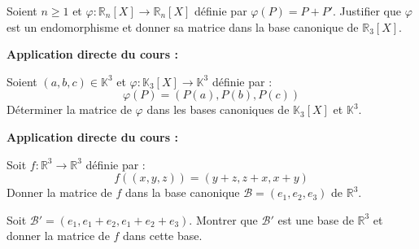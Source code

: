 \documentclass[french,11pt,twoside]{VcCours}
\newenvironment{ApplicationDirecte}{\textbf{Application directe du cours :}

}{}
\begin{document}
\vspace*{5cm}


\begin{Exemple}\label{det} Soient $n \geq 1$ et $\varphi : \mathbb{R}_n[X] \rightarrow \mathbb{R}_n[X]$ définie par $\varphi(P)=P+P'$. Justifier que $\varphi$ est un endomorphisme et donner sa matrice dans la base canonique de  $\mathbb{R}_3[X]$.


        \newpage


%
\end{Exemple}

\medskip

\begin{ApplicationDirecte} Soient $(a,b,c) \in \mathbb{K}^3$ et $\varphi : \mathbb{K}_3[X] \rightarrow \mathbb{K}^3$ définie par :
$$ \varphi(P) = (P(a), P(b), P(c))$$
Déterminer la matrice de $\varphi$ dans les bases canoniques de $\mathbb{K}_3[X]$ et $\mathbb{K}^3$.
\end{ApplicationDirecte}

\begin{ApplicationDirecte} Soit $f : \mathbb{R}^3 \rightarrow \mathbb{R}^3$ définie par :
$$ f((x,y,z)) = (y+z, z+x, x+y)$$
Donner la matrice de $f$ dans la base canonique $\mathcal{B}=(e_1,e_2,e_3)$ de $\mathbb{R}^3$. 

Soit $\mathcal{B}'=(e_1, e_1+e_2, e_1+e_2+e_3)$. Montrer que $\mathcal{B}'$ est une base de $\mathbb{R}^3$ et donner la matrice de $f$  dans cette base.
\end{ApplicationDirecte}
\end{document}
